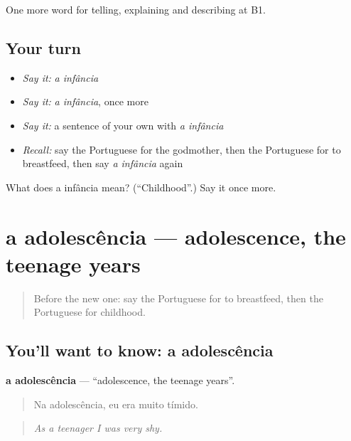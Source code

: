 \begin{grammarlens}[title={What you've built}]
One more word for telling, explaining and describing at B1.
\end{grammarlens}

\subsection*{Your turn}
\begin{itemize}
\raggedright
  \item \emph{Say it:} \emph{a infância}
  \item \emph{Say it:} \emph{a infância}, once more
  \item \emph{Say it:} a sentence of your own with \emph{a infância}
  \item \emph{Recall:} say the Portuguese for the godmother, then the Portuguese for to breastfeed, then say \emph{a infância} again
\end{itemize}

\begin{tcolorbox}[breakable,colback=teal!4,colframe=teal!35!black,title={Before you move on}]
What does a infância mean? (\textquotedblleft{}Childhood\textquotedblright{}.) Say it once more.
\end{tcolorbox}
\section[a adolescência]{a adolescência — adolescence, the teenage years}

\label{lesson:PT-C311-adolescencia}



\begin{quote}
Before the new one: say the Portuguese for to breastfeed, then the Portuguese for childhood.
\end{quote}

\subsection*{You'll want to know: a adolescência}
\textbf{a adolescência} — \textquotedblleft{}adolescence, the teenage years\textquotedblright{}.

\begin{quote}
Na adolescência, eu era muito tímido.
\end{quote}

\begin{quote}
\emph{As a teenager I was very shy.}
\end{quote}

